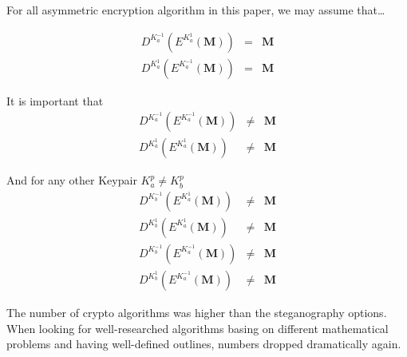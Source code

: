 For all asymmetric encryption algorithm in this paper, we may assume that\ldots

\begin{eqnarray}
D^{K^{-1}_a}\left(E^{K^{1}_a}\left(\mathbf{M}\right)\right) & = & \mathbf{M}\\
D^{K^{1}_a}\left(E^{K^{-1}_a}\left(\mathbf{M}\right)\right) & = & \mathbf{M}
\end{eqnarray} 

It is important that 
\begin{eqnarray}
D^{K^{-1}_a}\left(E^{K^{-1}_a}\left(\mathbf{M}\right)\right) & \neq & \mathbf{M}\\
D^{K^{1}_a}\left(E^{K^{1}_a}\left(\mathbf{M}\right)\right)   & \neq & \mathbf{M}
\end{eqnarray} 

And for any other Keypair $K^{p}_a \neq K^{p}_b$
\begin{eqnarray}
D^{K^{-1}_b}\left(E^{K^{1}_a}\left(\mathbf{M}\right)\right)  & \neq & \mathbf{M}\\
D^{K^{1}_b}\left(E^{K^{1}_a}\left(\mathbf{M}\right)\right)   & \neq & \mathbf{M}\\
D^{K^{-1}_b}\left(E^{K^{-1}_a}\left(\mathbf{M}\right)\right) & \neq & \mathbf{M}\\
D^{K^{1}_b}\left(E^{K^{-1}_a}\left(\mathbf{M}\right)\right)  & \neq & \mathbf{M}
\end{eqnarray} 

The number of crypto algorithms was higher than the steganography options. When looking for well-researched algorithms basing on different mathematical problems and having well-defined outlines, numbers dropped dramatically again.

